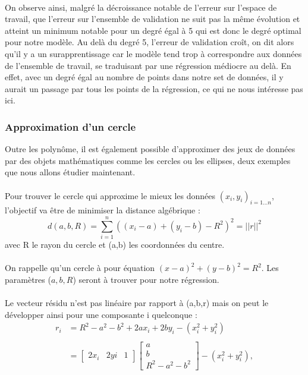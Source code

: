         \\
        On observe ainsi, malgré la décroissance notable de l'erreur sur l'espace de travail, que l'erreur sur l'ensemble de validation ne suit pas la même évolution et atteint un minimum notable pour un degré égal à 5 qui est donc le degré optimal pour notre modèle. Au delà du degré 5, l'erreur de validation croît, on dit alors qu'il y a un surapprentissage car le modèle tend trop à correspondre aux données de l'ensemble de travail, se traduisant par une régression médiocre au delà. En effet, avec un degré égal au nombre de points dans notre set de données, il y aurait un passage par tous les points de la régression, ce qui ne nous intéresse pas ici.
        
         \subsubsection{Approximation d'un cercle}
         Outre les polynôme, il est également possible d'approximer des jeux de données par des objets mathématiques comme les cercles ou les ellipses, deux exemples que nous allons étudier maintenant.
         \\\\
         Pour trouver le cercle qui approxime le mieux les données $(x_i,y_i)_{i=1...n}$, l'objectif va être de minimiser la distance algébrique :
         $$d(a,b,R)=\sum_{i=1}^n ((x_i-a)+(y_i-b)-R^2)^2=||r||^2$$
         avec R le rayon du cercle et (a,b) les coordonnées du centre.\\\\ On rappelle qu'un cercle à pour équation $(x-a)^2+(y-b)^2=R^2$. Les paramètres ($a,b,R$) seront à trouver pour notre régression.\\
         \\Le vecteur résidu n'est pas linéaire par rapport à (a,b,r) mais on peut le développer ainsi pour une composante i quelconque : \\
         \begin{align*}
         r_i &= R^2 - a^2 -b^2 +2 a x_i + 2 b y_i - (x_i^2 + y_i^2)\\\\
         &=\begin{bmatrix}2x_i&2yi&1\end{bmatrix}\begin{bmatrix}a\\b\\R^2-a^2-b^2\end{bmatrix}-(x_i^2+y_i^2),
         \end{align*}
